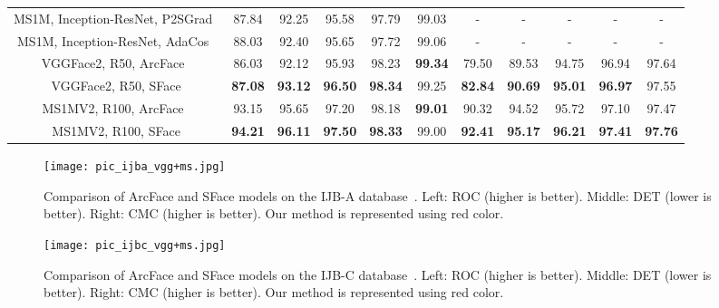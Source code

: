 \documentclass[journal,comsoc]{IEEEtran}
\begin{document}
\begin{table*}[htbp]
\begin{center}
{\begin{tabular}{|c|c|c|c|c|c|c|c|c|c|c|}
				\hline
				MS1M, Inception-ResNet, P2SGrad~\cite{zhang2019p2sgrad}& 87.84    & 92.25    & 95.58  & 97.79 & 99.03  & -         & -        & -      & -      & -       \\ 
				MS1M, Inception-ResNet, AdaCos~\cite{zhang2019adacos}& 88.03    & 92.40    & 95.65  & 97.72 &  99.06 & -         & -        & -      & -      & -       \\ \hline\hline
				VGGFace2, R50, ArcFace~\cite{deng2019arcface}&86.03&92.12&95.93 &98.23&\bf{99.34}&79.50&89.53&94.75&96.94&97.64\\ 
				VGGFace2, R50, SFace  
				&\bf{87.08}&\bf{93.12}&\bf{96.50} &\bf{98.34} & 99.25 &\bf{82.84}&\bf{90.69}&\bf{95.01}&\bf{96.97}&97.55\\ \hline			
				
				MS1MV2, R100, ArcFace~\cite{deng2019arcface}& 93.15    & 95.65    & 97.20  & 98.18 & \bf{99.01}  & 90.32     & 94.52    & 95.72  & 97.10  & 97.47   \\ 
				MS1MV2, R100, SFace & \bf{94.21}    & \bf{96.11}    & \bf{97.50}  & \bf{98.33} & 99.00  & \bf{92.41}     & \bf{95.17}    & \bf{96.21}  & \bf{97.41}  & \bf{97.76}   \\ \hline
			\end{tabular}
		}
	\end{center}
\end{table*}

\begin{figure*}[htbp]
	\center
	\texttt{[image: pic\_ijba\_vgg+ms.jpg]}
	\caption{Comparison of ArcFace and SFace models on the IJB-A  database~\cite{klare2015pushing}. Left: ROC (higher is better). Middle: DET (lower is better). Right: CMC (higher is better). Our method is represented using red color.}
	\label{fig:pic_ijba}
\end{figure*}

\begin{figure*}[htbp]
	\center
	\texttt{[image: pic\_ijbc\_vgg+ms.jpg]}
	\caption{Comparison of ArcFace and SFace models on the IJB-C database~\cite{maze2018iarpa}. Left: ROC (higher is better). Middle: DET (lower is better). Right: CMC (higher is better). Our method is represented using red color.}
	\label{fig:pic_ijbc}
\end{figure*}
\end{document}
